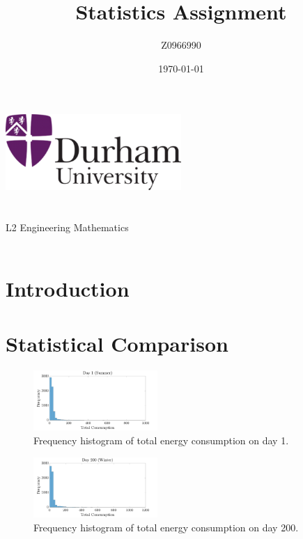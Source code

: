 \documentclass[a4paper,10pt,twocolumn]{article}
\author{Z0966990}
\title{Statistics Assignment}
\date{\today}
\begin{document}
    
\begin{titlepage}
    \centering
    \vspace*{\fill}
    \includegraphics[width=0.5\textwidth]{Durham}\\
    \vspace*{\fill}
    \LARGE\thetitle\\
    \large\theauthor\\
    \large L2 Engineering Mathematics\\
    \large\thedate\\
    \vspace*{\fill}
\end{titlepage}

\printnomenclature

\section{Introduction}
    
\section{Statistical Comparison}
    
\begin{figure}[h]
    \centering
    \includegraphics[width=0.42\textwidth]{Day1}
    \caption{Frequency histogram of total energy consumption on day 1.}
    \label{fig:Day1}
\end{figure}
\begin{figure}[h]
    \centering
    \includegraphics[width=0.42\textwidth]{Day200}
    \caption{Frequency histogram of total energy consumption on day 200.}
    \label{fig:Day200}
\end{figure}
\end{document}
